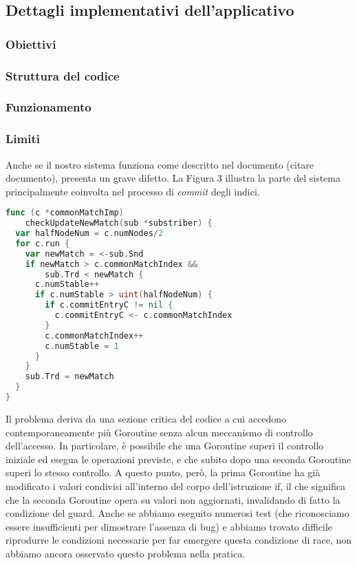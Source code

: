 \subsection{Dettagli implementativi dell'applicativo}
\subsubsection{Obiettivi}

\subsubsection{Struttura del codice}

\subsubsection{Funzionamento}

\subsubsection{Limiti}
Anche se il nostro sistema funziona come descritto nel documento (citare documento), presenta un grave difetto. La Figura 3 illustra la parte del sistema principalmente coinvolta nel processo di \textit{commit} degli indici.
\\
\begin{lstlisting}[language=Go]
func (c *commonMatchImp) 
    checkUpdateNewMatch(sub *substriber) { 
  var halfNodeNum = c.numNodes/2 
  for c.run { 
    var newMatch = <-sub.Snd 
    if newMatch > c.commonMatchIndex && 
        sub.Trd < newMatch { 
      c.numStable++ 
      if c.numStable > uint(halfNodeNum) {
        if c.commitEntryC != nil {
          c.commitEntryC <- c.commonMatchIndex
        } 
        c.commonMatchIndex++
        c.numStable = 1
      } 
    } 
    sub.Trd = newMatch
  } 
}
\end{lstlisting}
Il problema deriva da una sezione critica del codice a cui accedono contemporaneamente più Goroutine senza alcun meccanismo di controllo dell'accesso. In particolare, è possibile che una Goroutine 
superi il controllo iniziale ed esegua le operazioni previste, e che subito dopo una seconda Goroutine superi lo stesso controllo. A questo punto, però, la prima Goroutine ha già modificato i valori condivisi all'interno del 
corpo dell'istruzione if, il che significa che la seconda Goroutine opera su valori non aggiornati, invalidando di fatto la condizione del guard. Anche se abbiamo eseguito numerosi test (che riconosciamo essere insufficienti 
per dimostrare l'assenza di bug) e abbiamo trovato difficile riprodurre le condizioni necessarie per far emergere questa condizione di race, non abbiamo ancora osservato questo problema nella pratica.
